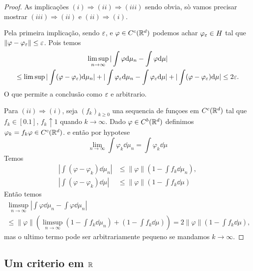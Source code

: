 \begin{proof}
 As implicações  $(i)\Rightarrow (ii) \Rightarrow (iii)$ sendo obvia, sò vamos precisar mostrar $(iii)\Rightarrow (ii)$ e $(ii)\Rightarrow (i)$.
 
Pela primeira implicação, sendo $\varepsilon$, e $\varphi \in C^c({\mathbb R}^d)$ podemos achar $\varphi_{\varepsilon}\in H$ tal que $\|\varphi-\varphi_{\varepsilon} \|\le \varepsilon$.
 Pois temos 
 \begin{multline}
  \limsup_{n\to \infty} |\int \varphi \mathrm{d} \mu_n-\int \varphi \mathrm{d} \mu|\\
  \le \limsup |\int (\varphi-\varphi_{\varepsilon}) \mathrm{d} \mu_n|+|\int \varphi_{\varepsilon} \mathrm{d} \mu_n-\int \varphi_{\varepsilon}\mathrm{d} \mu|
  + |\int (\varphi-\varphi_{\varepsilon})\mathrm{d} \mu|\le 
  2\varepsilon.
 \end{multline}
O que permite a conclusão como $\varepsilon$ e arbitrario.

\medskip

Para $(ii)\Rightarrow (i)$, seja $(f_k)_{k\ge 0}$ una sequencia de funçoes em $C^c({\mathbb R}^d)$ tal que 
$f_k\in [0.1]$, $f_k \uparrow 1$ quando $k \to \infty$. Dado $\varphi \in C^b({\mathbb R}^d)$ definimos $\varphi_k=f_k\varphi \in C^c({\mathbb R}^d)$.
e então por hypotese
$$\lim_{n\to \infty} \int \varphi_k \dd \mu_n= \int \varphi_k \dd \mu  $$ 
Temos 
\begin{equation}
 \begin{split}
 \left |\int (\varphi-\varphi_k) \dd \mu_n \right| & \le  \| \varphi \| \left(1- \int f_k \dd \mu_n \right),\\
    \left|\int (\varphi-\varphi_k) \dd \mu\right| & \le  \| \varphi \| \left(1- \int f_k \dd \mu \right)
 \end{split}
\end{equation}
Então temos 
\begin{multline}
 \limsup_{n\to \infty} \left|\int \varphi\dd \mu_n-\int \varphi\dd \mu_n\right|\\
 \le   \| \varphi \| \left( \limsup_{n\to \infty} \left(1- \int f_k \dd \mu_n \right)
 + \left(1- \int f_k \dd \mu \right) \right) = 2 \| \varphi \| \left(1- \int f_k \dd \mu \right),
\end{multline}
mas o ultimo termo pode ser arbitrariamente pequeno se mandamos $k\to \infty$.
\end{proof}

\subsection{Um criterio em ${\mathbb R}$}

